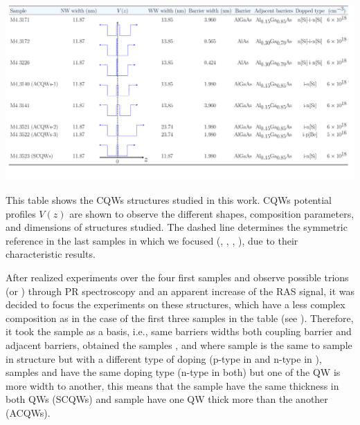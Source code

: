 \begin{landscape}
	\begin{table}
		\centering
		\includegraphics[width=\textwidth]{../tables/chapter-3/table-1-samples/build-ruco/table-1-samples.pdf}
		\caption[Table of samples description]{This table shows the CQWs structures studied in this work.  CQWs potential profiles $V(z)$ are shown to observe the different shapes, composition parameters, and dimensions of structures studied. The dashed line determines the symmetric reference in the last samples in which we focused (\tucu, \tcvu, \tcvd, \tcvt), due to their characteristic results. }
		\label{tab:chapter3:Samples description} 
	\end{table}
\end{landscape}

After realized experiments over the four first samples and observe possible trions  (\xp or \xm)  through \gls{PR} spectroscopy and an apparent increase of the RAS signal, it was decided to focus the experiments on these structures, which have a less complex composition as in the case of the first three samples in the table (see ). Therefore,  it took the sample \tucu as a  basis, i.e., same barriers widths both coupling barrier and adjacent barriers, obtained the samples \tcvu, \tcvd and \tcvt where sample \tcvd is the same to sample \tcvu in structure but with a different type of doping (p-type in \tcvd and n-type in \tcvu), samples \tcvu and \tcvd have the same doping type (n-type in both) but one of the QW is more width to another, this means that the sample \tcvt have the same thickness in both QWs (SCQWs) and sample \tcvu have one  QW  thick more than the another (ACQWs). 

